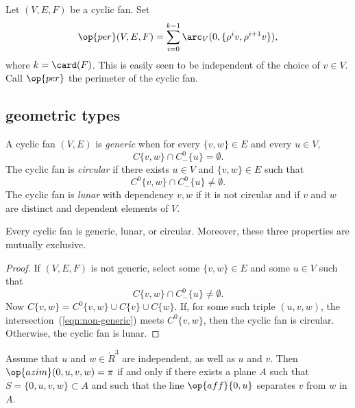\begin{definition}[perimeter]\label{lemma:perim}
Let $(V,E,F)$ be a cyclic fan.    Set
$$
\op{per}(V,E,F) = \sum_{i=0}^{k-1} \arc_V(0,\{\rho^i v,\rho^{i+1} v\}), 
$$
where  $k=\card(F)$.
This is easily seen to be independent of the choice of $v\in V$.  Call $\op{per}$ the perimeter of the cyclic fan.
\end{definition}
%
%
%

\subsection{geometric types}

\begin{definition}
A cyclic fan $(V,E)$ is {\it generic} when for every $\{v,w\}\in E$
and every $u\in V$, 
$$
C\{v,w\}\cap C^0_-\{u\} = \emptyset.
$$
The cyclic fan is {\it circular} if there exists $u\in V$ and $\{v,w\}\in E$ such that 
$$
C^0\{v,w\}\cap C^0_-\{u\}\ne \emptyset.
$$
The cyclic fan is {\it lunar} with dependency $v,w$ if it is not circular and if $v$ and $w$ are distinct and dependent elements of $V$.
\end{definition}
%
%
%

\begin{lemma} Every cyclic fan is
generic, lunar, or circular.  Moreover, these three properties are mutually exclusive.
\end{lemma}
%
%
%
%
%

\begin{proof} If $(V,E,F)$ is not generic,  select some $\{v,w\}\in E$
and some $u\in V$ such that
\begin{equation}\label{eqn:non-generic}
C\{v,w\}\cap C^0_-\{u\} \ne \emptyset.
\end{equation}
Now $C\{v,w\} = C^0\{v,w\} \cup C\{v\}\cup C\{w\}$.  
If, for some such triple $(u,v,w)$, the intersection~(\ref{eqn:non-generic}) meets $C^0\{v,w\}$, then the cyclic fan is circular.  
Otherwise, the cyclic fan is lunar. 
\end{proof}

\begin{lemma}  \label{lemma:coplanar}
Assume that $u$ and $w\in\ring{R}^3$ are independent, as well as $u$ and $v$.  Then $\op{azim}(0,u,v,w)=\pi$
if and only if there exists a plane $A$ such that
$S=\{0,u,v,w\}\subset A$ and such that the line $\op{aff}\{0,u\}$ separates $v$ from $w$ in $A$.
\end{lemma}

